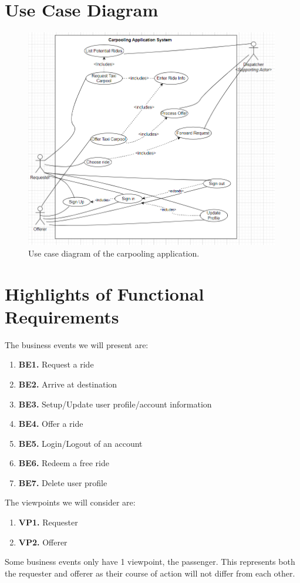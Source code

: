 \documentclass[]{article}
\begin{document}
\newpage\section{Use Case Diagram}
\label{sec:use_case_diagram}
\begin{figure}[h]
	\centering
	\includegraphics[width=30em]{usecase_v3.png}
	\caption{Use case diagram of the carpooling application.}
	\label{fig:usecase}
\end{figure}

\section{Highlights of Functional Requirements}
\label{sec:functional_requirements}
The business events we will present are:
\begin{enumerate}
    \item[] \textbf{BE1.} Request a ride
    \item[] \textbf{BE2.} Arrive at destination
    \item[] \textbf{BE3.} Setup/Update user profile/account information
    \item[] \textbf{BE4.} Offer a ride
    \item[] \textbf{BE5.} Login/Logout of an account
    \item[] \textbf{BE6.} Redeem a free ride
    \item[] \textbf{BE7.} Delete user profile
\end{enumerate}

The viewpoints we will consider are:
\begin{enumerate}
    \item[] \textbf{VP1.} Requester
    \item[] \textbf{VP2.} Offerer
\end{enumerate}
Some business events only have 1 viewpoint, the passenger. This represents both the requester and offerer as their course of action will not differ from each other.
\end{document}
